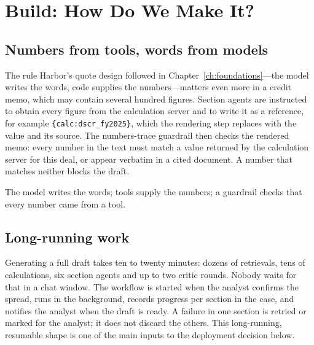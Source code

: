 
\section{Build: How Do We Make It?}
\label{sec:loan-build}

\subsection{Numbers from tools, words from models}

The rule Harbor's quote design followed in Chapter~\ref{ch:foundations}---the model writes the words, code supplies the numbers---matters even more in a credit memo, which may contain several hundred figures. Section agents are instructed to obtain every figure from the calculation server and to write it as a reference, for example \texttt{\{calc:dscr\_fy2025\}}, which the rendering step replaces with the value and its source. The numbers-trace guardrail then checks the rendered memo: every number in the text must match a value returned by the calculation server for this deal, or appear verbatim in a cited document. A number that matches neither blocks the draft.

\begin{keyidea}
The model writes the words; tools supply the numbers; a guardrail checks that every number came from a tool.
\end{keyidea}

\subsection{Long-running work}

Generating a full draft takes ten to twenty minutes: dozens of retrievals, tens of calculations, six section agents and up to two critic rounds. Nobody waits for that in a chat window. The workflow is started when the analyst confirms the spread, runs in the background, records progress per section in the case, and notifies the analyst when the draft is ready. A failure in one section is retried or marked for the analyst; it does not discard the others. This long-running, resumable shape is one of the main inputs to the deployment decision below.

